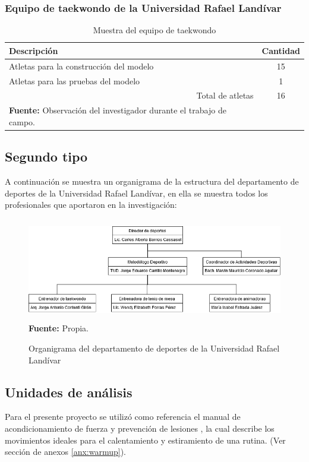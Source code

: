 \subsubsection{Equipo de taekwondo de la Universidad Rafael Land\'ivar}\label{sj:1t:tae}
\begin{table}[H]
\begin{center}
\caption{Muestra del equipo de taekwondo}
\label{tab:MuestraTaekwondo}
\begin{tabular}{lc}
\hline
\multicolumn{1}{|l|}{\textbf{Descripci\'on}} & \multicolumn{1}{l|}{\textbf{Cantidad}} \\ \hline
\multicolumn{1}{|l|}{Atletas para la construcci\'on del modelo} & \multicolumn{1}{c|}{15} \\ \hline
\multicolumn{1}{|l|}{Atletas para las pruebas del modelo} & \multicolumn{1}{c|}{1} \\ \hline
\multicolumn{1}{|r|}{Total de atletas} & \multicolumn{1}{c|}{16} \\ \hline
\textbf{Fuente:} Observaci\'on del investigador durante el trabajo de campo.
\end{tabular}
\end{center}
\end{table}
\subsection{Segundo tipo} \label{sj:2t}
A continuaci\'on se muestra un organigrama de la estructura del departamento de deportes de la Universidad Rafael Land\'ivar, en ella se muestra todos los profesionales que aportaron en la investigaci\'on:
\begin{figure}[H]
	\caption{Organigrama del departamento de deportes de la Universidad Rafael Land\'ivar}
	\label{fig:orgDeportes}
	\centering
	\includegraphics[width=450px,height=170px]{graphics/orgDeportes.png} \\
	\textbf{Fuente:} Propia.
\end{figure}
\subsection{Unidades de an\'alisis} \label{sj:ua}
Para el presente proyecto se utiliz\'o como referencia el manual de acondicionamiento de fuerza y prevenci\'on de lesiones  \cite{arbour2006strength}, la cual describe los movimientos ideales para el calentamiento  y estiramiento de una rutina. (Ver secci\'on de anexos \ref{anx:warmup}).